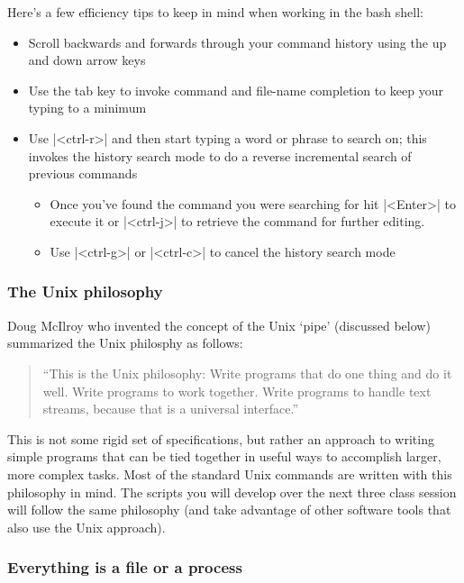 \documentclass[10pt,letterpaper]{article}
\begin{document}
Here's a few efficiency tips to keep in mind when working in the bash shell:
\begin{itemize}
    \item Scroll backwards and forwards through your command history using the up and down arrow keys
    \item Use the tab key to invoke command and file-name completion to keep your typing to a minimum
    \item Use |<ctrl-r>| and then start typing a word or phrase to search on; this invokes the history search mode to do a reverse incremental search of previous commands
    \begin{itemize}
        \item Once you've found the command you were searching for hit |<Enter>| to execute it or |<ctrl-j>| to retrieve the command for further editing.
        \item Use |<ctrl-g>| or |<ctrl-c>| to cancel the history search mode
    \end{itemize}
\end{itemize}


\subsubsection*{The Unix philosophy}

Doug McIlroy who invented the concept of the Unix `pipe' (discussed below) summarized the Unix philosphy as follows:

\begin{quote}
``This is the Unix philosophy: Write programs that do one thing and do it well. Write programs to work together. Write programs to handle text streams, because that is a universal interface.''
\end{quote}

This is not some rigid set of specifications, but rather an approach to writing simple programs that can be tied together in useful ways to accomplish larger, more complex tasks. Most of the standard Unix commands are written with this philosophy in mind. The scripts you will develop over the next three class session will follow the same philosophy (and take advantage of other software tools that also use the Unix approach).


\subsubsection*{Everything is a file or a process}
\end{document}
